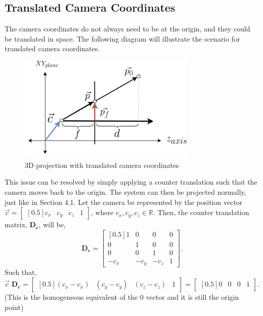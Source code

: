 \documentclass[12pt, letterpaper]{article}
\begin{document}
\subsection{Translated Camera Coordinates}
The camera coordinates do not always need to be at the origin, and they could be translated in space. The following diagram will illustrate the scenario for translated camera coordinates. 
\begin{figure}[H]
\centering
\includegraphics[width=8.5cm]{translated_3d.png}
\caption{3D projection with translated camera coordinates}
\label{fig:figure}
\end{figure} 
\noindent This issue can be resolved by simply applying a counter translation such that the camera moves back to the origin. The system can then be projected normally, just like in Section 4.1. Let the camera be represented by the position vector $\vec{c} = \begin{bmatrix}[0.5] c_x & c_y & c_z & 1\end{bmatrix}$, where $c_x, c_y, c_z \in \mathbb{R}$. Then, the counter translation matrix, $\mathbf{D_c}$, will be,
\begin{equation}
    \mathbf{D_c} = \begin{bmatrix}[0.5] 1 & 0 & 0 & 0 \\ 0 & 1 & 0 & 0 \\ 0 & 0 & 1 & 0 \\ -c_x & -c_y & -c_z & 1 \end{bmatrix}.
\end{equation}
Such that, $\vec{c}\;\mathbf{D_c} = \begin{bmatrix}[0.5](c_{x}-c_x)&(c_{y}-c_y)&(c_{z}-c_z)&1 \end{bmatrix} = \begin{bmatrix}[0.5]0&0&0&1 \end{bmatrix}$. (This is the homogeneous equivalent of the 0 vector and it is still the origin point)
\end{document}
